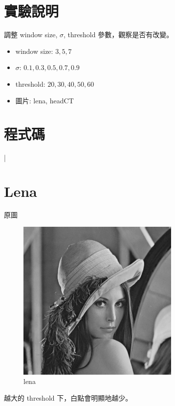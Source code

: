 \documentclass[conference]{IEEEtran}
\begin{document}


\section{實驗說明}
調整 window size, $\sigma$, threshold 參數，觀察是否有改變。

\begin{itemize}
\item window size: $3,5,7$
\item $\sigma$: $0.1,0.3,0.5,0.7,0.9$
\item threshold: $20,30,40,50,60$
\item 圖片: lena, headCT 
\end{itemize}

\section{程式碼}


|\section{Lena}

原圖

\begin{figure}[H]
\centerline{\includegraphics[width=8cm]{lena.png}}
\caption{lena}
\label{lena}
\end{figure}
越大的 threshold 下，白點會明顯地越少。
\end{document}
